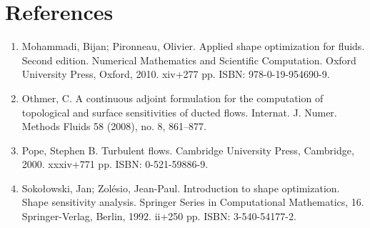 \documentclass{article}
\numberwithin{equation}{section}
\begin{document}
\section*{References}
\begin{enumerate}
    \item Mohammadi, Bijan; Pironneau, Olivier. Applied shape optimization for fluids. Second edition. Numerical Mathematics and Scientific Computation. Oxford University Press, Oxford, 2010. xiv+277 pp. ISBN: 978-0-19-954690-9.
    \item Othmer, C. A continuous adjoint formulation for the computation of topological and surface sensitivities of ducted flows. Internat. J. Numer. Methods Fluids 58 (2008), no. 8, 861–877.
    \item Pope, Stephen B. Turbulent flows. Cambridge University Press, Cambridge, 2000. xxxiv+771 pp. ISBN: 0-521-59886-9.
    \item Sokołowski, Jan; Zolésio, Jean-Paul. Introduction to shape optimization. Shape sensitivity analysis. Springer Series in Computational Mathematics, 16. Springer-Verlag, Berlin, 1992. ii+250 pp. ISBN: 3-540-54177-2.
\end{enumerate}

\printbibliography[heading=bibintoc]
\end{document}
